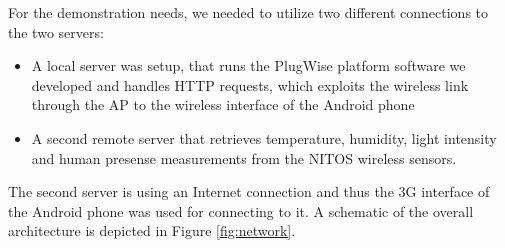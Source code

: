 \documentclass[conference]{IEEEtran}
\begin{document}
For the demonstration needs, we needed to utilize two different connections to the two servers:
\begin{itemize}
\item A local server was setup, that runs the PlugWise platform software we developed and handles HTTP requests, which exploits the wireless link through the AP to the wireless interface of the Android phone
\item A second remote server that retrieves temperature, humidity, light intensity and human presense measurements from the NITOS wireless sensors. 
\end{itemize}
The second server is using an Internet connection and thus the 3G interface of the Android phone was used for connecting to it. 
A schematic of the overall architecture is depicted in Figure \ref{fig:network}.



%
%



%
%
\end{document}

